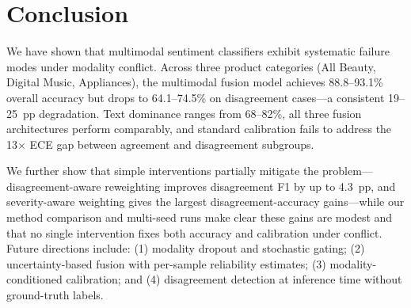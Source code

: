 \documentclass[11pt,a4paper]{article}
\begin{document}
\section{Conclusion}

We have shown that multimodal sentiment classifiers exhibit systematic failure modes under modality conflict.
Across three product categories (All Beauty, Digital Music, Appliances), the multimodal fusion model achieves 88.8--93.1\% overall accuracy but drops to 64.1--74.5\% on disagreement cases---a consistent 19--25~pp degradation.
Text dominance ranges from 68--82\%, all three fusion architectures perform comparably, and standard calibration fails to address the 13$\times$ ECE gap between agreement and disagreement subgroups.

We further show that simple interventions partially mitigate the problem---disagreement-aware reweighting improves disagreement F1 by up to 4.3~pp, and severity-aware weighting gives the largest disagreement-accuracy gains---while our method comparison and multi-seed runs make clear these gains are modest and that no single intervention fixes both accuracy and calibration under conflict.
Future directions include:
(1) modality dropout and stochastic gating;
(2) uncertainty-based fusion with per-sample reliability estimates;
(3) modality-conditioned calibration;
and (4) disagreement detection at inference time without ground-truth labels.



\end{document}
